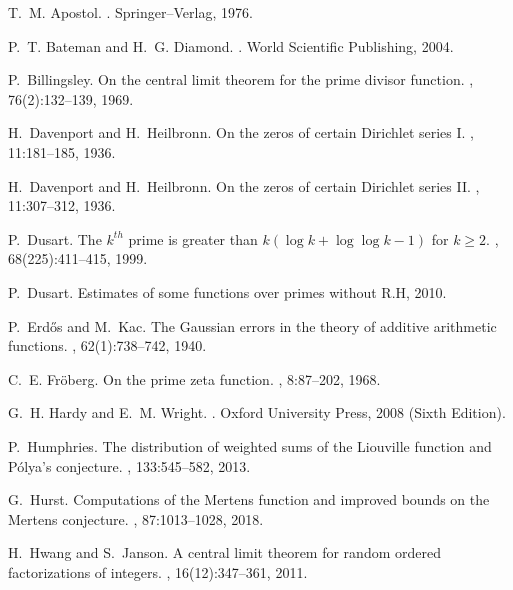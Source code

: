 \documentclass[11pt,reqno,a4letter]{article}
\numberwithin{equation}{section}
\numberwithin{figure}{section}
\numberwithin{table}{section}
\theoremstyle{plain}
\numberwithin{theorem}{section}
\theoremstyle{definition}
\begin{document}
\begin{thebibliography}{10}

T.~M. Apostol.
.
\newblock Springer--Verlag, 1976.

P.~T. Bateman and H.~G. Diamond.
.
\newblock World Scientific Publishing, 2004.

P.~Billingsley.
\newblock On the central limit theorem for the prime divisor function.
, 76(2):132--139, 1969.

H.~Davenport and H.~Heilbronn.
\newblock On the zeros of certain {D}irichlet series {I}.
, 11:181--185, 1936.

H.~Davenport and H.~Heilbronn.
\newblock On the zeros of certain {D}irichlet series {II}.
, 11:307--312, 1936.

P.~Dusart.
\newblock The $k^{th}$ prime is greater than $k(\log k +\log\log k-1)$ for $k
  \geq 2$.
, 68(225):411--415, 1999.

P.~Dusart.
\newblock Estimates of some functions over primes without {R}.{H}, 2010.

P.~Erd{\H{o}}s and M.~Kac.
\newblock The {G}aussian errors in the theory of additive arithmetic functions.
, 62(1):738--742, 1940.

C.~E. Fr{\"{o}}berg.
\newblock On the prime zeta function.
, 8:87--202, 1968.

G.~H. Hardy and E.~M. Wright.
.
\newblock Oxford University Press, 2008 (Sixth Edition).

P.~Humphries.
\newblock The distribution of weighted sums of the {L}iouville function and
  {P}\'{o}lya's conjecture.
, 133:545--582, 2013.

G.~Hurst.
\newblock Computations of the {M}ertens function and improved bounds on the
  {M}ertens conjecture.
, 87:1013--1028, 2018.

H.~Hwang and S.~Janson.
\newblock A central limit theorem for random ordered factorizations of
  integers.
, 16(12):347--361, 2011.


\end{thebibliography}
\end{document}
